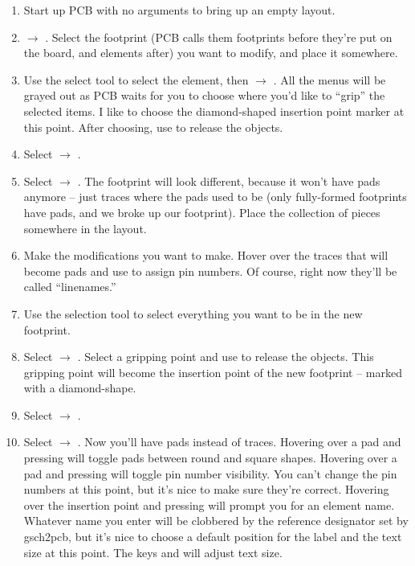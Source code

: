 \begin{enumerate}
	\item Start up PCB with no arguments to bring up an empty layout.
	\item {} $\rightarrow$ .  Select the footprint (PCB calls them footprints before they're put on the board, and elements after) you want to modify, and place it somewhere.
	\item Use the select tool to select the element, then  $\rightarrow$ .  All the menus will be grayed out as PCB waits for you to choose where you'd like to ``grip'' the selected items.  I like to choose the diamond-shaped insertion point marker at this point.  After choosing, use  to release the objects.
	\item Select  $\rightarrow$ .
	\item Select  $\rightarrow$ .  The footprint will look different, because it won't have pads anymore -- just traces where the pads used to be (only fully-formed footprints have pads, and we broke up our footprint).  Place the collection of pieces somewhere in the layout.
	\item Make the modifications you want to make.  Hover over the traces that will become pads and use  to assign pin numbers.  Of course, right now they'll be called ``linenames.''
	\item Use the selection tool to select everything you want to be in the new footprint.
	\item Select  $\rightarrow$ .  Select a gripping point and use  to release the objects.  This gripping point will become the insertion point of the new footprint -- marked with a diamond-shape.  
	\item Select  $\rightarrow$ .
	\item Select  $\rightarrow$ .  Now you'll have pads instead of traces.  Hovering over a pad and pressing  will toggle pads between round and square shapes.  Hovering over a pad and pressing  will toggle pin number visibility.  You can't change the pin numbers at this point, but it's nice to make sure they're correct.  Hovering over the insertion point and pressing  will prompt you for an element name.  Whatever name you enter will be clobbered by the reference designator set by gsch2pcb, but it's nice to choose a default position for the label and the text size at this point.  The keys  and  will adjust text size.
	

\end{enumerate}
